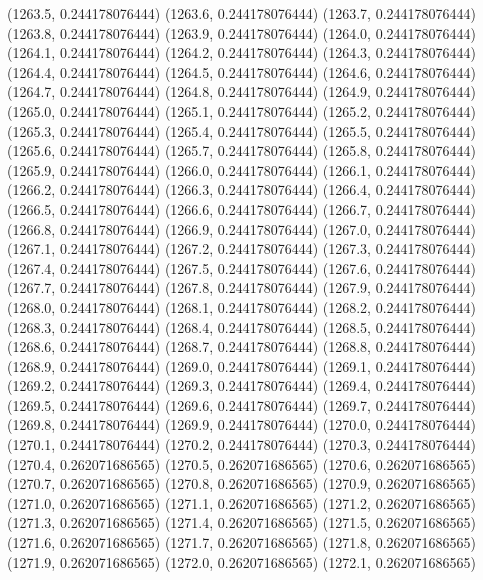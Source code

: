 {					(1263.5, 0.244178076444)
					(1263.6, 0.244178076444)
					(1263.7, 0.244178076444)
					(1263.8, 0.244178076444)
					(1263.9, 0.244178076444)
					(1264.0, 0.244178076444)
					(1264.1, 0.244178076444)
					(1264.2, 0.244178076444)
					(1264.3, 0.244178076444)
					(1264.4, 0.244178076444)
					(1264.5, 0.244178076444)
					(1264.6, 0.244178076444)
					(1264.7, 0.244178076444)
					(1264.8, 0.244178076444)
					(1264.9, 0.244178076444)
					(1265.0, 0.244178076444)
					(1265.1, 0.244178076444)
					(1265.2, 0.244178076444)
					(1265.3, 0.244178076444)
					(1265.4, 0.244178076444)
					(1265.5, 0.244178076444)
					(1265.6, 0.244178076444)
					(1265.7, 0.244178076444)
					(1265.8, 0.244178076444)
					(1265.9, 0.244178076444)
					(1266.0, 0.244178076444)
					(1266.1, 0.244178076444)
					(1266.2, 0.244178076444)
					(1266.3, 0.244178076444)
					(1266.4, 0.244178076444)
					(1266.5, 0.244178076444)
					(1266.6, 0.244178076444)
					(1266.7, 0.244178076444)
					(1266.8, 0.244178076444)
					(1266.9, 0.244178076444)
					(1267.0, 0.244178076444)
					(1267.1, 0.244178076444)
					(1267.2, 0.244178076444)
					(1267.3, 0.244178076444)
					(1267.4, 0.244178076444)
					(1267.5, 0.244178076444)
					(1267.6, 0.244178076444)
					(1267.7, 0.244178076444)
					(1267.8, 0.244178076444)
					(1267.9, 0.244178076444)
					(1268.0, 0.244178076444)
					(1268.1, 0.244178076444)
					(1268.2, 0.244178076444)
					(1268.3, 0.244178076444)
					(1268.4, 0.244178076444)
					(1268.5, 0.244178076444)
					(1268.6, 0.244178076444)
					(1268.7, 0.244178076444)
					(1268.8, 0.244178076444)
					(1268.9, 0.244178076444)
					(1269.0, 0.244178076444)
					(1269.1, 0.244178076444)
					(1269.2, 0.244178076444)
					(1269.3, 0.244178076444)
					(1269.4, 0.244178076444)
					(1269.5, 0.244178076444)
					(1269.6, 0.244178076444)
					(1269.7, 0.244178076444)
					(1269.8, 0.244178076444)
					(1269.9, 0.244178076444)
					(1270.0, 0.244178076444)
					(1270.1, 0.244178076444)
					(1270.2, 0.244178076444)
					(1270.3, 0.244178076444)
					(1270.4, 0.262071686565)
					(1270.5, 0.262071686565)
					(1270.6, 0.262071686565)
					(1270.7, 0.262071686565)
					(1270.8, 0.262071686565)
					(1270.9, 0.262071686565)
					(1271.0, 0.262071686565)
					(1271.1, 0.262071686565)
					(1271.2, 0.262071686565)
					(1271.3, 0.262071686565)
					(1271.4, 0.262071686565)
					(1271.5, 0.262071686565)
					(1271.6, 0.262071686565)
					(1271.7, 0.262071686565)
					(1271.8, 0.262071686565)
					(1271.9, 0.262071686565)
					(1272.0, 0.262071686565)
					(1272.1, 0.262071686565)
}
